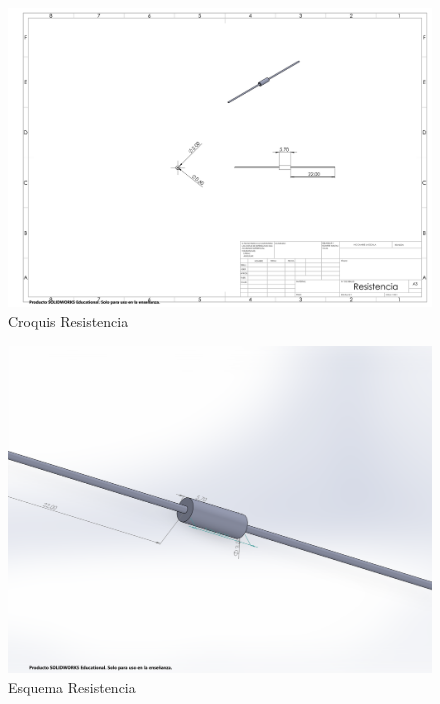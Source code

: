     \begin{figure}[H]
        \centering
        \includegraphics[trim = {1mm 1mm 1mm 1mm},clip,scale=0.2]{25/img/croquisResistencia.pdf}
        \caption{Croquis Resistencia}
        \label{croquis:resistencia}
    \end{figure}
    \begin{figure}[H]
        \centering
        \includegraphics[trim = {10mm 10mm 10mm 10mm},clip,scale=0.2]{25/img/resistencia.pdf}
        \caption{Esquema Resistencia}
        \label{fig: resistencia}
    \end{figure}
